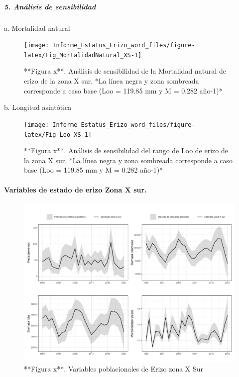 \documentclass[
]{article}
\begin{document}
\hypertarget{anuxe1lisis-de-sensibilidad-2}{%
\subparagraph{\texorpdfstring{\textbf{\emph{5. Análisis de
sensibilidad}}}{5. Análisis de sensibilidad}}\label{anuxe1lisis-de-sensibilidad-2}}

a. Mortalidad natural

\begin{figure}

{\centering \texttt{[image: Informe\_Estatus\_Erizo\_word\_files/figure-latex/Fig\_MortalidadNatural\_XS-1]} 

}

\caption{**Figura x**.  Análisis de sensibilidad de la Mortalidad natural de erizo de la zona X sur. *La línea negra y zona sombreada corresponde a caso base (Loo = 119.85 mm y M = 0.282 año-1)*}\label{fig:Fig_MortalidadNatural_XS}
\end{figure}

b. Longitud asintótica

\begin{figure}

{\centering \texttt{[image: Informe\_Estatus\_Erizo\_word\_files/figure-latex/Fig\_Loo\_XS-1]} 

}

\caption{**Figura x**.  Análisis de sensibilidad del rango de Loo de erizo de la zona X sur. *La línea negra y zona sombreada corresponde a caso base (Loo = 119.85 mm y M = 0.282 año-1)*}\label{fig:Fig_Loo_XS}
\end{figure}

\hypertarget{variables-de-estado-de-erizo-zona-x-sur.}{%
\paragraph{Variables de estado de erizo Zona X
sur.}\label{variables-de-estado-de-erizo-zona-x-sur.}}

\begin{figure}

{\centering \includegraphics{Figuras/Fig_VarpoblXS-1} 

}

\caption{**Figura x**. Variables poblacionales de Erizo zona X Sur}\label{fig:Fig_VarpoblXS}
\end{figure}
\end{document}
